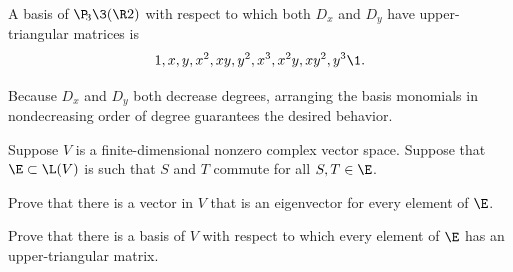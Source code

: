\begin{Solution}
A basis of $\P\!_3\3(\R2)$ with respect to which both $D_x$ and $D_y$ have upper-triangular matrices is
\[
1, x, y, x^2, xy, y^2, x^3, x^2 y, x y^2, y^3\1.
\]

Because $D_x$ and $D_y$ both decrease degrees, arranging the basis monomials in nondecreasing order of degree guarantees the desired behavior.
\end{Solution}

\exercise
Suppose $V$ is a finite-dimensional nonzero complex vector space. Suppose that $\E \subset \L(V)$ is such that $S$ and $T$ commute for all $S, T \in \E$. \label{4ManyOps}
\begin{subtheorem}
\item
Prove that there is a vector in $V$ that is an eigenvector for every element of $\E$.
\item
Prove that there is a basis of $V$ with respect to which every element of $\E$ has an upper-triangular matrix.
\end{subtheorem}
%

